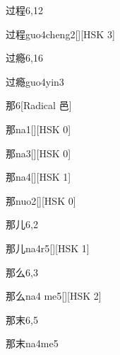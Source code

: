 \begin{entry}{过程}{6,12}
  \begin{phonetics}{过程}{guo4cheng2}[][HSK 3]
  \end{phonetics}
\end{entry}

\begin{entry}{过瘾}{6,16}
  \begin{phonetics}{过瘾}{guo4yin3}
  \end{phonetics}
\end{entry}

\begin{entry}{那}{6}[Radical 邑]
  \begin{phonetics}{那}{na1}[][HSK 0]
  \end{phonetics}
  \begin{phonetics}{那}{na3}[][HSK 0]
  \end{phonetics}
  \begin{phonetics}{那}{na4}[][HSK 1]
  \end{phonetics}
  \begin{phonetics}{那}{nuo2}[][HSK 0]
  \end{phonetics}
\end{entry}

\begin{entry}{那儿}{6,2}
  \begin{phonetics}{那儿}{na4r5}[][HSK 1]
  \end{phonetics}
\end{entry}

\begin{entry}{那么}{6,3}
  \begin{phonetics}{那么}{na4 me5}[][HSK 2]
  \end{phonetics}
\end{entry}

\begin{entry}{那末}{6,5}
  \begin{phonetics}{那末}{na4me5}
  \end{phonetics}
\end{entry}

